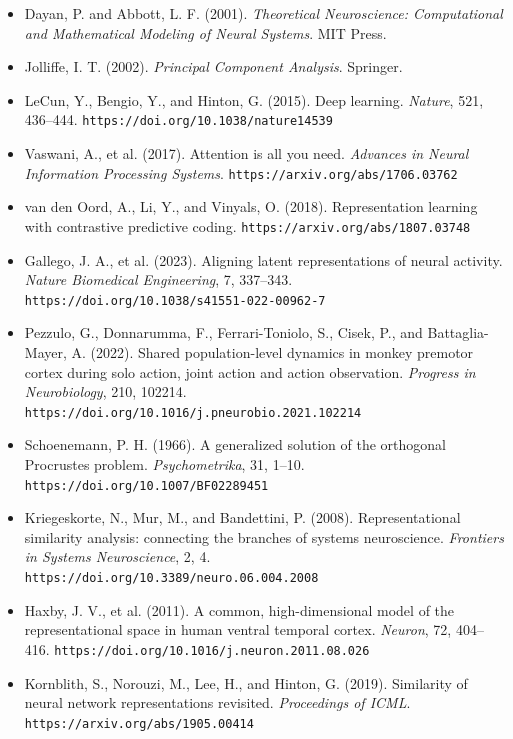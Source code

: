 \documentclass[11pt]{article}
\begin{document}
\begin{itemize}
    \item Dayan, P. and Abbott, L. F. (2001).
    \textit{Theoretical Neuroscience: Computational and Mathematical Modeling
    of Neural Systems}. MIT Press.

    \item Jolliffe, I. T. (2002).
    \textit{Principal Component Analysis}. Springer.

    \item LeCun, Y., Bengio, Y., and Hinton, G. (2015).
    Deep learning.
    \textit{Nature}, 521, 436--444.
    \texttt{https://doi.org/10.1038/nature14539}

    \item Vaswani, A., et al. (2017).
    Attention is all you need.
    \textit{Advances in Neural Information Processing Systems}.
    \texttt{https://arxiv.org/abs/1706.03762}

    \item van den Oord, A., Li, Y., and Vinyals, O. (2018).
    Representation learning with contrastive predictive coding.
    \texttt{https://arxiv.org/abs/1807.03748}

    \item Gallego, J. A., et al. (2023).
    Aligning latent representations of neural activity.
    \textit{Nature Biomedical Engineering}, 7, 337--343.
    \texttt{https://doi.org/10.1038/s41551-022-00962-7}

    \item Pezzulo, G., Donnarumma, F., Ferrari-Toniolo, S., Cisek, P.,
    and Battaglia-Mayer, A. (2022).
    Shared population-level dynamics in monkey premotor cortex during solo
    action, joint action and action observation.
    \textit{Progress in Neurobiology}, 210, 102214.
    \texttt{https://doi.org/10.1016/j.pneurobio.2021.102214}

    \item Schoenemann, P. H. (1966).
    A generalized solution of the orthogonal Procrustes problem.
    \textit{Psychometrika}, 31, 1--10.
    \texttt{https://doi.org/10.1007/BF02289451}

    \item Kriegeskorte, N., Mur, M., and Bandettini, P. (2008).
    Representational similarity analysis: connecting the branches of systems
    neuroscience.
    \textit{Frontiers in Systems Neuroscience}, 2, 4.
    \texttt{https://doi.org/10.3389/neuro.06.004.2008}

    \item Haxby, J. V., et al. (2011).
    A common, high-dimensional model of the representational space in human
    ventral temporal cortex.
    \textit{Neuron}, 72, 404--416.
    \texttt{https://doi.org/10.1016/j.neuron.2011.08.026}

    \item Kornblith, S., Norouzi, M., Lee, H., and Hinton, G. (2019).
    Similarity of neural network representations revisited.
    \textit{Proceedings of ICML}.
    \texttt{https://arxiv.org/abs/1905.00414}

\end{itemize}
\end{document}
